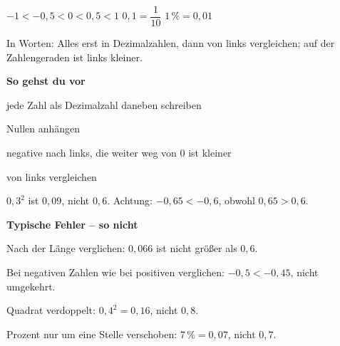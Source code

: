 \documentclass[11pt]{article}
\newcommand{\nr}[1]{\makebox[7mm][l]{\textbf{#1}}}
\begin{document}
\begin{tcolorbox}[colback=mbkasten,colframe=mbgrau,boxrule=0.5pt,arc=1mm,left=3mm,right=3mm,top=2mm,bottom=2mm,title={\bfseries Formel auf einen Blick},coltitle=black,colbacktitle=black!10]
\begin{minipage}[t]{0.58\linewidth}\vspace{0pt}
{\Large $-1 < -0{,}5 < 0 < 0{,}5 < 1$ \qquad $0{,}1 = \dfrac{1}{10}$ \qquad $1\,\% = 0{,}01$}\par\medskip
In Worten: Alles erst in Dezimalzahlen, dann von links vergleichen; auf der Zahlengeraden ist links kleiner.\par\medskip
\textbf{So gehst du vor}\par
\nr{1}jede Zahl als Dezimalzahl daneben schreiben\par
\nr{2}Nullen anhängen\par
\nr{3}negative nach links, die weiter weg von 0 ist kleiner\par
\nr{4}von links vergleichen\par
\medskip
{\small $0{,}3^2$ ist $0{,}09$, nicht $0{,}6$. Achtung: $-0{,}65 < -0{,}6$, obwohl $0{,}65 > 0{,}6$.}
\end{minipage}\hfill
\begin{minipage}[t]{0.38\linewidth}\vspace{2mm}\centering
{}
\end{minipage}
\end{tcolorbox}
\medskip\noindent\textbf{Typische Fehler – so nicht}\par\smallskip
\noindent\nr{$\times$}Nach der Länge verglichen: $0{,}066$ ist nicht größer als $0{,}6$.\par
\noindent\nr{$\times$}Bei negativen Zahlen wie bei positiven verglichen: $-0{,}5 < -0{,}45$, nicht umgekehrt.\par
\noindent\nr{$\times$}Quadrat verdoppelt: $0{,}4^2 = 0{,}16$, nicht $0{,}8$.\par
\noindent\nr{$\times$}Prozent nur um eine Stelle verschoben: $7\,\% = 0{,}07$, nicht $0{,}7$.\par
\end{document}
